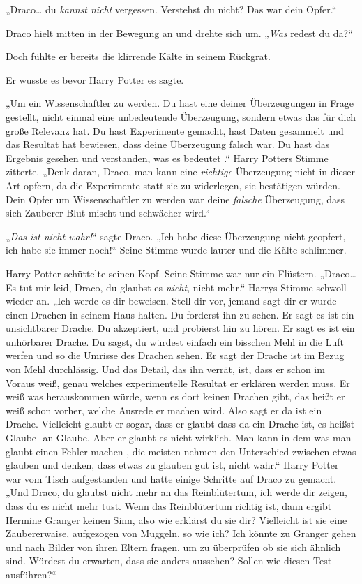 {„Draco… du \emph{kannst nicht} vergessen. Verstehst du nicht? Das war dein Opfer.“

Draco hielt mitten in der Bewegung an und drehte sich um. „\emph{Was} redest du da?“

Doch fühlte er bereits die klirrende Kälte in seinem Rückgrat.

Er wusste es bevor Harry Potter es sagte.

„Um ein Wissenschaftler zu werden. Du hast eine deiner Überzeugungen in Frage gestellt, nicht einmal eine unbedeutende Überzeugung, sondern etwas das für dich große Relevanz hat. Du hast Experimente gemacht, hast Daten gesammelt und das Resultat hat bewiesen, dass deine Überzeugung falsch war. Du hast das Ergebnis gesehen und verstanden, was es bedeutet .“ Harry Potters Stimme zitterte. „Denk daran, Draco, man kann eine \emph{richtige} Überzeugung nicht in dieser Art opfern, da die Experimente statt sie zu widerlegen, sie bestätigen würden. Dein Opfer um Wissenschaftler zu werden war deine \emph{falsche} Überzeugung, dass sich Zauberer Blut mischt und schwächer wird.“

„\emph{Das ist nicht wahr!}“ sagte Draco. „Ich habe diese Überzeugung nicht geopfert, ich habe sie immer noch!“ Seine Stimme wurde lauter und die Kälte schlimmer.

Harry Potter schüttelte seinen Kopf. Seine Stimme war nur ein Flüstern. „Draco… Es tut mir leid, Draco, du glaubst es \emph{nicht}, nicht mehr.“ Harrys Stimme schwoll wieder an. „Ich werde es dir beweisen. Stell dir vor, jemand sagt dir er wurde einen Drachen in seinem Haus halten. Du forderst ihn zu sehen. Er sagt es ist ein unsichtbarer Drache. Du akzeptiert, und probierst hin zu hören. Er sagt es ist ein unhörbarer Drache. Du sagst, du würdest einfach ein bisschen Mehl in die Luft werfen und so die Umrisse des Drachen sehen. Er sagt der Drache ist im Bezug von Mehl durchlässig. Und das Detail, das ihn verrät, ist, dass er schon im Voraus weiß, genau welches experimentelle Resultat er erklären werden muss. Er weiß was herauskommen würde, wenn es dort keinen Drachen gibt, das heißt er weiß schon vorher, welche Ausrede er machen wird. Also sagt er da ist ein Drache. Vielleicht glaubt er sogar, dass er glaubt dass da ein Drache ist, es heißst Glaube- an-Glaube. Aber er glaubt es nicht wirklich. Man kann in dem was man glaubt einen Fehler machen , die meisten nehmen den Unterschied zwischen etwas glauben und denken, dass etwas zu glauben gut ist, nicht wahr.“ Harry Potter war vom Tisch aufgestanden und hatte einige Schritte auf Draco zu gemacht. „Und Draco, du glaubst nicht mehr an das Reinblütertum, ich werde dir zeigen, dass du es nicht mehr tust. Wenn das Reinblütertum richtig ist, dann ergibt Hermine Granger keinen Sinn, also wie erklärst du sie dir? Vielleicht ist sie eine Zaubererwaise, aufgezogen von Muggeln, so wie ich? Ich könnte zu Granger gehen und nach Bilder von ihren Eltern fragen, um zu überprüfen ob sie sich ähnlich sind. Würdest du erwarten, dass sie anders aussehen? Sollen wie diesen Test ausführen?“

}
